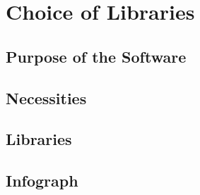 

\chapter{Choice of Libraries}
\label{cha:lorem_ipsum}

\section{Purpose of the Software} 
\label{sub:purpose_of_the_software}


\section{Necessities} 
\label{sub:Necessities}


\section{Libraries}
\label{sub:libraries}

	
\section{Infograph}


\lipsum[1-100]
\lipsum[1-100]
\lipsum[1-100]
